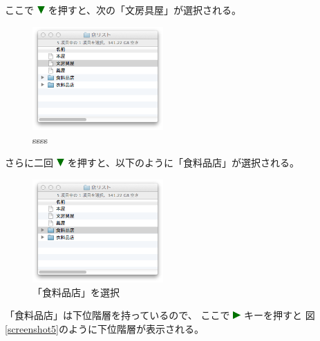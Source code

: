 \documentclass[twoside]{wiss}
\def\figwidth{50mm}
\def\down{ \includegraphics[width=3mm,bb=0 0 36 36]{figures/downtriangle.pdf} }
\def\right{ \includegraphics[width=3mm,bb=0 0 36 36]{figures/righttriangle.pdf} }
\begin{document}
\noindent
ここで{\down}を押すと、次の「文房具屋」が選択される。

\begin{figure}[H]
\centerline{\includegraphics[width=\figwidth,bb=0 0 344 272]{figures/f43016d1b524baf414f2c32c48fe9588.png}}
\caption{ssss}
\label{「文房具屋」を選択}
\end{figure}

\noindent
さらに二回{\down}を押すと、以下のように「食料品店」が選択される。

\begin{figure}[H]
\centerline{\includegraphics[width=\figwidth,bb=0 0 344 272]{figures/c074cd6daec3da0341125d1492b8a09c.png}}
\caption{「食料品店」を選択}
\label{screenshot4}
\end{figure}

\noindent
「食料品店」は下位階層を持っているので、
ここで{\right}キーを押すと
図\ref{screenshot5}のように下位階層が表示される。
\end{document}
